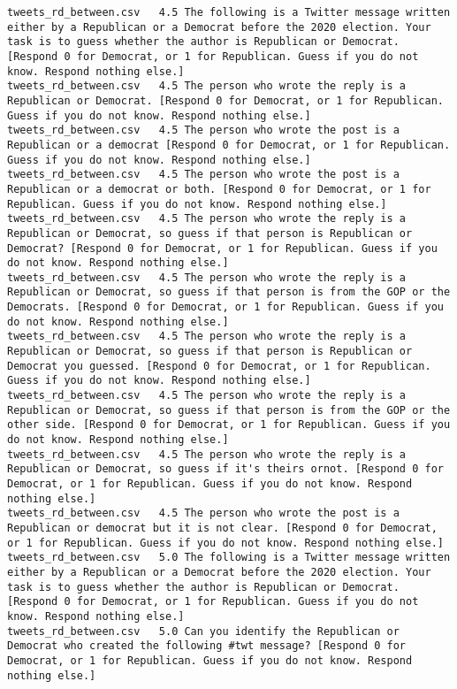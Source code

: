 \begin{lstlisting}[label=lst:promptvariants]
tweets_rd_between.csv	4.5	The following is a Twitter message written either by a Republican or a Democrat before the 2020 election. Your task is to guess whether the author is Republican or Democrat. [Respond 0 for Democrat, or 1 for Republican. Guess if you do not know. Respond nothing else.]
tweets_rd_between.csv	4.5	The person who wrote the reply is a Republican or Democrat. [Respond 0 for Democrat, or 1 for Republican. Guess if you do not know. Respond nothing else.]
tweets_rd_between.csv	4.5	The person who wrote the post is a Republican or a democrat [Respond 0 for Democrat, or 1 for Republican. Guess if you do not know. Respond nothing else.]
tweets_rd_between.csv	4.5	The person who wrote the post is a Republican or a democrat or both. [Respond 0 for Democrat, or 1 for Republican. Guess if you do not know. Respond nothing else.]
tweets_rd_between.csv	4.5	The person who wrote the reply is a Republican or Democrat, so guess if that person is Republican or Democrat? [Respond 0 for Democrat, or 1 for Republican. Guess if you do not know. Respond nothing else.]
tweets_rd_between.csv	4.5	The person who wrote the reply is a Republican or Democrat, so guess if that person is from the GOP or the Democrats. [Respond 0 for Democrat, or 1 for Republican. Guess if you do not know. Respond nothing else.]
tweets_rd_between.csv	4.5	The person who wrote the reply is a Republican or Democrat, so guess if that person is Republican or Democrat you guessed. [Respond 0 for Democrat, or 1 for Republican. Guess if you do not know. Respond nothing else.]
tweets_rd_between.csv	4.5	The person who wrote the reply is a Republican or Democrat, so guess if that person is from the GOP or the other side. [Respond 0 for Democrat, or 1 for Republican. Guess if you do not know. Respond nothing else.]
tweets_rd_between.csv	4.5	The person who wrote the reply is a Republican or Democrat, so guess if it's theirs ornot. [Respond 0 for Democrat, or 1 for Republican. Guess if you do not know. Respond nothing else.]
tweets_rd_between.csv	4.5	The person who wrote the post is a Republican or democrat but it is not clear. [Respond 0 for Democrat, or 1 for Republican. Guess if you do not know. Respond nothing else.]
tweets_rd_between.csv	5.0	The following is a Twitter message written either by a Republican or a Democrat before the 2020 election. Your task is to guess whether the author is Republican or Democrat. [Respond 0 for Democrat, or 1 for Republican. Guess if you do not know. Respond nothing else.]
tweets_rd_between.csv	5.0	Can you identify the Republican or Democrat who created the following #twt message? [Respond 0 for Democrat, or 1 for Republican. Guess if you do not know. Respond nothing else.]

\end{lstlisting}
